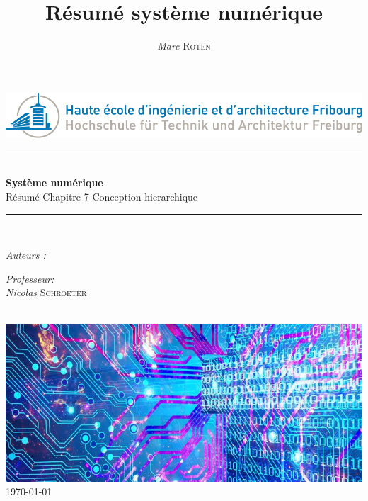 

\title{Résumé système numérique} 
\author{\textsl{Marc} \textsc{Roten}}
\date{}


    \begin{titlepage}
        \begin{center}
            \includegraphics[scale=.4]{Img/heia-fr-logo.png}\\[1.3cm]
            
            \rule{\linewidth}{0.3mm} \\[0.3cm]
            {\huge \bfseries Système numérique\\[0.5cm]} 
            {\Large  Résumé Chapitre 7 Conception hierarchique }
            \rule{\linewidth}{0.3mm} \\[0.8cm]
            \noindent{}
            \begin{minipage}[t]{0.4\textwidth}
                \begin{flushleft} \large
                    \emph{Auteurs :}\\
                    \theauthor
                \end{flushleft}
            \end{minipage}
            \begin{minipage}[t]{0.4\textwidth} 
                \begin{flushright} \large
                    \emph{Professeur:}\\
                    \textsl{Nicolas} \textsc{ Schroeter}\\ 
                \end{flushright} 
                \vfill
            \end{minipage}\\[1.3cm]
            \includegraphics[scale=0.7]{Img/title.jpg}\\[1.5cm]
            \vspace*{1\baselineskip}
            \today \\[0.7cm]
        \end{center}
    \end{titlepage}
    \tableofcontents
    \clearpage

